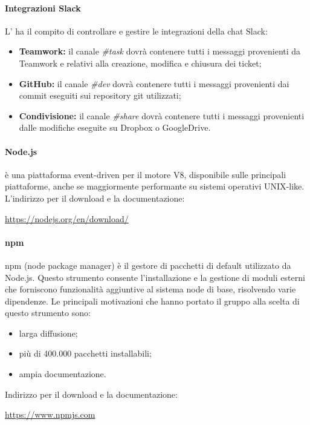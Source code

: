 	\paragraph{Integrazioni Slack} \label{sec:intSlack}
	L'\amministratore{} ha il compito di controllare e gestire le integrazioni della chat Slack:
	\begin{itemize}
		\item \textbf{Teamwork:} il canale \textit{\#task} dovrà contenere tutti i messaggi provenienti da Teamwork e relativi alla creazione, modifica e chiusura dei ticket;
		\item \textbf{GitHub:} il canale \textit{\#dev} dovrà contenere tutti i messaggi provenienti dai commit eseguiti sui repository git utilizzati;
		\item \textbf{Condivisione:} il canale \textit{\#share} dovrà contenere tutti i messaggi provenienti dalle modifiche eseguite su Dropbox o GoogleDrive.
	\end{itemize}
	\paragraph{Node.js}
	 è una piattaforma event-driven per il motore  V8, disponibile sulle principali piattaforme, anche se maggiormente performante su sistemi operativi UNIX-like.
	L'indirizzo per il download e la documentazione:
	\begin{center}
		\url{https://nodejs.org/en/download/}
	\end{center}
	\paragraph{npm}
	npm (node package manager) è il gestore di pacchetti di default utilizzato da Node.js. Questo strumento consente  l'installazione e la gestione di moduli esterni che forniscono funzionalità aggiuntive al sistema node di base, risolvendo varie dipendenze.
	Le principali motivazioni che hanno portato il gruppo alla scelta di questo strumento sono:
	\begin{itemize}
		\item larga diffusione;
		\item più di 400.000 pacchetti installabili;
		\item ampia documentazione.
	\end{itemize}
	Indirizzo per il download e la documentazione:
	\begin{center}
		\url{https://www.npmjs.com}
	\end{center}
